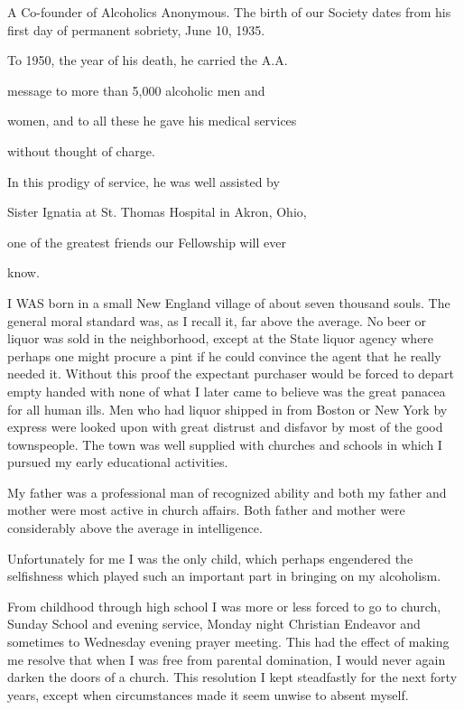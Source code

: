 

\begin{biblechapter}


\verse A Co-founder of Alcoholics Anonymous.
\verse The birth of our Society dates from his first day of permanent sobriety, 
    June 10, 1935.

To 1950, the year of his death, he carried the A.A.

message  to  more  than  5,000  alcoholic  men  and

women, and to all these he gave his medical services

without thought of charge.

In this prodigy of service, he was well assisted by

Sister Ignatia at St. Thomas Hospital in Akron, Ohio,

one of the greatest friends our Fellowship will ever

know.


I WAS born in a small New England village of about seven thousand souls. The general moral standard was, as I recall it, far above the average. No beer or liquor was sold in the neighborhood, except at the State liquor agency where perhaps one might procure a pint if he could convince the agent that he really needed it. Without this proof the expectant purchaser would be forced to depart empty handed with none of what I later came to believe was the great panacea for all human ills. Men who had liquor shipped in from Boston or New York by express were looked upon with great distrust and disfavor by most of the good townspeople. The town was well supplied with churches and schools in which I pursued my early educational activities.

My father was a professional man of recognized ability and both my father and mother were most active in church affairs. Both father and mother were considerably above the average in intelligence.

Unfortunately for me I was the only child, which perhaps engendered the selfishness which played such an important part in bringing on my alcoholism.

From childhood through high school I was more or less forced to go to church, Sunday School and evening service, Monday night Christian Endeavor and sometimes to Wednesday evening prayer meeting. This had the effect of making me resolve that when I was free from parental domination, I would never again darken the doors of a church. This resolution I kept steadfastly for the next forty years, except when circumstances made it seem unwise to absent myself.


\end{biblechapter}
